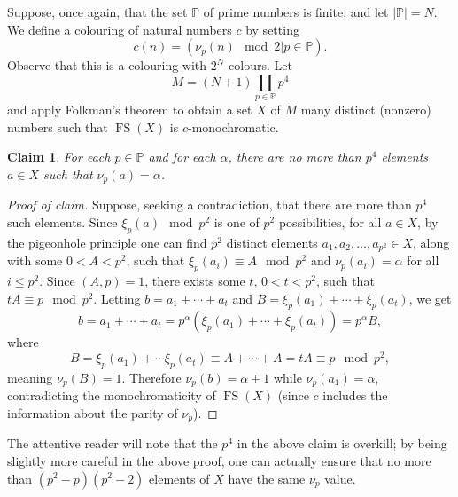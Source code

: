 \documentclass[10pt]{amsart}
\DeclareMathOperator{\fs}{FS}
\newtheorem{claim}{Claim}%
\theoremstyle{definition}
\begin{document}
Suppose, once again, that the set $\mathbb P$ of prime numbers is finite, and let $|\mathbb P|=N$. We define a colouring of natural numbers $c$ by setting
\begin{equation*}
c(n)=(\nu_p(n)\mod 2\big|p\in\mathbb P).
\end{equation*}
Observe that this is a colouring with $2^N$ colours. Let
\begin{equation*}
M=(N+1)\prod_{p\in\mathbb P}p^4
\end{equation*}
and apply Folkman's theorem to obtain a set $X$ of $M$ many distinct (nonzero) numbers such that $\fs(X)$ is $c$-monochromatic.

\begin{claim}
For each $p\in\mathbb P$ and for each $\alpha$, there are no more than $p^4$ elements $a\in X$ such that $\nu_p(a)=\alpha$. 
\end{claim}

\begin{proof}[Proof of claim]
Suppose, seeking a contradiction, that there are more than $p^4$ such elements. Since $\xi_p(a)\mod p^2$ is one of $p^2$ possibilities, for all $a\in X$, by the pigeonhole principle one can find $p^2$ distinct elements $a_1,a_2,\ldots,a_{p^2}\in X$, along with some $0<A<p^2$, such that $\xi_p(a_i)\equiv A\mod p^2$ and $\nu_p(a_i)=\alpha$ for all $i\leq p^2$. Since $(A,p)=1$, there exists some $t$, $0<t<p^2$, such that $tA\equiv p\mod p^2$. Letting $b=a_1+\cdots+a_t$ and $B=\xi_p(a_1)+\cdots+\xi_p(a_t)$, we get
\begin{equation*}
b=a_1+\cdots+a_t=p^\alpha(\xi_p(a_1)+\cdots+\xi_p(a_t))=p^\alpha B,
\end{equation*}
where
\begin{equation*}
B=\xi_p(a_1)+\cdots\xi_p(a_t)\equiv A+\cdots+A=tA\equiv p\mod p^2,
\end{equation*}
meaning $\nu_p(B)=1$. Therefore $\nu_p(b)=\alpha+1$ while $\nu_p(a_1)=\alpha$, contradicting the monochromaticity of $\fs(X)$ (since $c$ includes the information about the parity of $\nu_p$).
\end{proof}
The attentive reader will note that the $p^4$ in the above claim is overkill; by being slightly more careful in the above proof, one can actually ensure that no more than $(p^2-p)(p^2-2)$ elements of $X$ have the same $\nu_p$ value.
\end{document}

